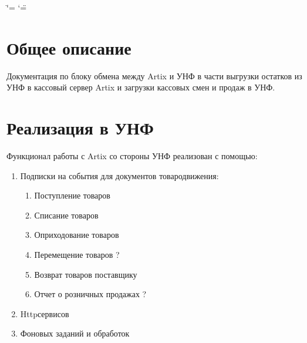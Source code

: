 \documentclass[twoside,11pt,a4paper,notitlepage]{report}
\date{\displaydate{date}}
\begin{document}
\ifdefined\shorthandoff
  \ifnum\catcode`\=\string=\active\shorthandoff{=}\fi
  \ifnum\catcode`\"=\active{}\fi
\fi

\pagestyle{empty}

\pagestyle{plain}
\label{\detokenize{index::doc}}





\chapter{Общее описание}
\label{\detokenize{description:id1}}\label{\detokenize{description::doc}}

Документация по блоку обмена между Artix и УНФ в части выгрузки остатков из УНФ в кассовый сервер Artix и загрузки кассовых смен и продаж в УНФ.








\chapter{Реализация в УНФ}
\label{\detokenize{unf:id1}}\label{\detokenize{unf::doc}}

Функционал работы с Artix со стороны УНФ реализован с помощью:
\begin{enumerate}

\item {} 

Подписки на события для документов товародвижения:
\begin{enumerate}

\item {} 

Поступление товаров

\item {} 

Списание товаров

\item {} 

Оприходование товаров

\item {} 

Перемещение товаров ?

\item {} 

Возврат товаров поставщику

\item {} 
\sphinxAtStartPar
Отчет о розничных продажах ?

\end{enumerate}

\item {} 
\sphinxAtStartPar
Http\sphinxhyphen{}сервисов

\item {} 
\sphinxAtStartPar
Фоновых заданий и обработок

\end{enumerate}
\end{document}
